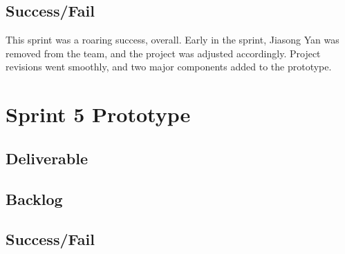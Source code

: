 \subsection{Success/Fail}
This sprint was a roaring success, overall. Early in the sprint, Jiasong Yan was removed from the team, and the project was adjusted accordingly. Project revisions went smoothly, and two major components added to the prototype.

\section{Sprint 5 Prototype}
\subsection{Deliverable}
\subsection{Backlog}
\subsection{Success/Fail}

